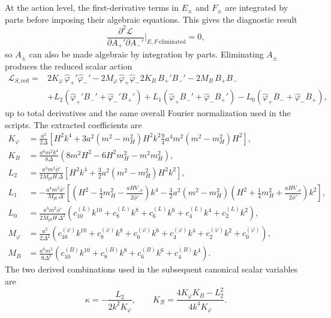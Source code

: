 \documentclass[11pt]{article}
\newcommand{\Mpl}{M_{\mathrm{pl}}}
\begin{document}
At the action level, the first-derivative terms in $E_\pm$ and $F_\pm$ are integrated by parts before imposing their algebraic equations. This gives the diagnostic result
\begin{equation}
\frac{\partial^2\mathcal L}{\partial A_+'\partial A_-'}\bigg|_{E,F\ \mathrm{eliminated}} = 0,
\end{equation}
so $A_\pm$ can also be made algebraic by integration by parts. Eliminating $A_\pm$ produces the reduced scalar action
\begin{align}
\mathcal L_{S,\mathrm{red}}={}&
2K_\varphi\,\hat\varphi_+'\hat\varphi_-'
-2M_\varphi\,\hat\varphi_+\hat\varphi_-
2K_B\,B_+'B_-'
-2M_B\,B_+B_- \nonumber \\
&+L_2\left(\hat\varphi_+'B_-'+\hat\varphi_-'B_+'\right)
+L_1\left(\hat\varphi_+B_-'+\hat\varphi_-B_+'\right)
-L_0\left(\hat\varphi_+B_-+\hat\varphi_-B_+\right),
\end{align}
up to total derivatives and the same overall Fourier normalization used in the scripts. The extracted coefficients are
\begin{align}
K_\varphi &=
\frac{a^2}{2\Delta}
\left[
H^2k^4+3a^2(m^2-m_H^2)H^2k^2
\frac94 a^4m^2(m^2-m_H^2)H^2
\right], \\
K_B &=
\frac{a^6m^2k^4}{8\Delta}
\left(8m^2H^2-6H^2m_H^2-m^2m_H^2\right), \\
L_2 &=
\frac{a^3m^2\bar\phi'}{2\Mpl H\,\Delta}
\left[
H^2k^4+\frac32 a^2(m^2-m_H^2)H^2k^2
\right], \\
L_1 &=
-\frac{a^4m^2\bar\phi'}{\Mpl\,\Delta}
\left[
\left(H^2-\frac14m_H^2-\frac{aHV_{,\phi}}{2\bar\phi'}\right)k^4
-\frac32a^2(m^2-m_H^2)
\left(H^2+\frac14m_H^2+\frac{aHV_{,\phi}}{2\bar\phi'}\right)k^2
\right], \\
L_0 &=
\frac{a^3m^2\bar\phi'}{2\Mpl H\,\Delta^2}
\left(c_{10}^{(L)}k^{10}+c_8^{(L)}k^8+c_6^{(L)}k^6+c_4^{(L)}k^4+c_2^{(L)}k^2\right), \\
M_\varphi &=
\frac{a^2}{2\Delta^2}
\left(c_{10}^{(\varphi)}k^{10}+c_8^{(\varphi)}k^8+c_6^{(\varphi)}k^6
+c_4^{(\varphi)}k^4+c_2^{(\varphi)}k^2+c_0^{(\varphi)}\right), \\
M_B &=
\frac{a^6m^2}{8\Delta^2}
\left(c_{10}^{(B)}k^{10}+c_8^{(B)}k^8+c_6^{(B)}k^6+c_4^{(B)}k^4\right).
\end{align}
The two derived combinations used in the subsequent canonical scalar variables are
\begin{equation}
\kappa=-\frac{L_2}{2k^2K_\varphi},
\qquad
K_{\mathcal B}=\frac{4K_\varphi K_B-L_2^2}{4k^4K_\varphi}.
\end{equation}
\end{document}
